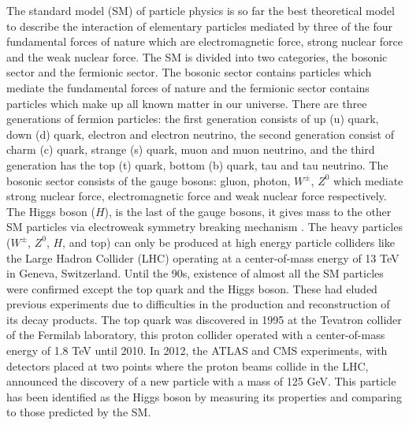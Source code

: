 \documentclass[final,12pt]{article}
\begin{document}
The standard model (SM) of particle physics is so far the best theoretical model to describe the interaction of elementary particles mediated by three of the four fundamental forces of nature which are electromagnetic force, strong nuclear force and the weak nuclear force. The SM is divided into two categories, the bosonic sector and the fermionic sector.
The bosonic sector contains particles which mediate the fundamental forces of nature and the fermionic sector contains particles which make up all known matter in our universe.
There are three generations of fermion particles: the first generation consists of up (u) quark, down (d) quark, electron and electron neutrino, the second generation consist of charm (c) quark, strange (s) quark, muon and muon neutrino, and the third generation has the top (t) quark, bottom (b) quark, tau and tau neutrino.
The bosonic sector consists of the gauge bosons: gluon, photon, $W^{\pm}$, $Z^0$ which mediate strong nuclear force, electromagnetic force and weak nuclear force respectively.
The Higgs boson ($H$), is the last of the gauge bosons, it gives mass to the other SM particles via electroweak symmetry breaking mechanism \cite{Chatrchyan:2012xdj}.
The heavy particles ($W^{\pm}$, $Z^0$, $H$, and top) can only be produced at high energy particle colliders like the Large Hadron Collider (LHC) operating at a center-of-mass energy of 13 TeV in Geneva, Switzerland.
Until the 90s, existence of almost all the SM particles were confirmed except the top quark and the Higgs boson. 
These had eluded previous experiments due to difficulties in the production and reconstruction of its decay products.
The top quark was discovered in 1995 at the Tevatron collider of the Fermilab laboratory, this proton collider operated with a center-of-mass energy of 1.8 TeV until 2010.
In 2012, the ATLAS and CMS experiments, with detectors placed at two points where the proton beams collide in the LHC, announced the discovery of a new particle with a mass of 125 GeV.
This particle has been identified as the Higgs boson by measuring its properties and comparing to those predicted by the SM.
\end{document}
